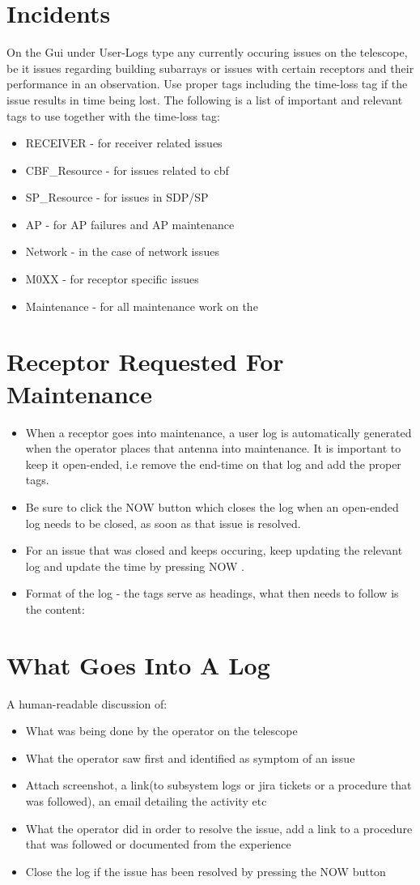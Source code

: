 
\section{Incidents}
On the Gui under User-Logs type any currently occuring issues on the telescope, be it issues regarding building subarrays or issues with certain receptors and their performance in an observation. Use proper tags including the time-loss tag if the issue results in time being lost. The following is a list of important and relevant tags to use together with the time-loss tag:
\begin{itemize}
	\item RECEIVER - for receiver related issues
	\item CBF\_Resource - for issues related to cbf
	\item SP\_Resource - for issues in SDP/SP 
	\item AP - for AP failures and AP maintenance
	\item Network -  in the case of network issues
	\item M0XX - for receptor specific issues
	\item Maintenance - for all maintenance work on the
\end{itemize}
 \section{ Receptor Requested For Maintenance}
\begin{itemize}
\item When a receptor goes into maintenance, a user log is automatically generated when the operator places that antenna into maintenance. It is important to keep it open-ended, i.e remove the end-time on that log and add the proper tags.
\item Be sure to click the NOW button which closes the log when an open-ended log needs to be closed, as soon as that issue is resolved.
\item For an issue that was closed and keeps occuring, keep updating the relevant log and update the time by pressing NOW .
\item Format of the log - the tags serve as headings, what then needs to follow is the content:
\end{itemize}
\section{ What Goes Into A Log}
A human-readable discussion of:
\begin{itemize}
\item What was being done by the operator on the telescope
\item What the operator saw first and identified as symptom of an issue
\item Attach screenshot, a link(to subsystem logs or jira tickets or a procedure that was followed), an email detailing the activity etc
\item What the operator did in order to resolve the issue, add a link to a procedure that was followed or documented from the experience
\item Close the log if the issue has been resolved by pressing the NOW button
\end{itemize}
